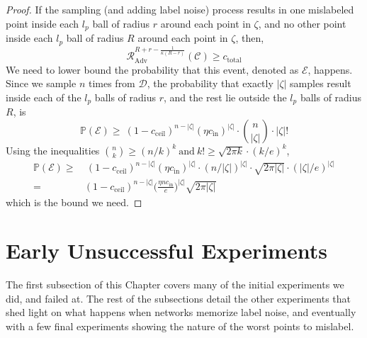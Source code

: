 \documentclass{ociamthesis}
\begin{document}
\begin{proof}
If the sampling (and adding label noise) process results in one mislabeled point
inside each $l_p$ ball of radius $r$ around each point in $\zeta$, and no other
point inside each $l_p$ ball of radius $R$ around each point in $\zeta$, then,
\begin{equation*}
    \mathcal{R}_{\text{Adv}}^{R+r-\frac{1}{\kappa(R-r)}}
    (\mathcal{C}) \geq
    c_{\text{total}}
\end{equation*}
We need to lower bound the probability that this event, denoted as
$\mathcal{E}$, happens. Since we sample $n$ times from $\mathcal{D}$, the
probability that exactly $|\zeta|$ samples result inside each of the $l_p$ balls
of radius $r$, and the rest lie outside the $l_p$ balls of radius $R$, is
\begin{equation*}
        \mathbb{P}(\mathcal{E})
        \geq 
        ~(1-c_{\text{ceil}})^{n-|\zeta|}
        (\eta c_\text{in})^{|\zeta|} \cdot {n \choose |\zeta|} \cdot |\zeta|!
\end{equation*}
Using the inequalities ${n \choose k} \geq (n/k)^k~\text{and}~k! \geq \sqrt{2\pi
k}\cdot(k/e)^k$,
\begin{equation*}
    \begin{split}
        \mathbb{P}(\mathcal{E})
        \geq &
        ~(1-c_{\text{ceil}})^{n-|\zeta|}
        (\eta c_\text{in})^{|\zeta|} \cdot {(n/|\zeta|)^{|\zeta|}} \cdot
        \sqrt{2\pi |\zeta|}\cdot(|\zeta|/e)^{|\zeta|} \\
        = &
        (1-c_{\text{ceil}})^{n-|\zeta|}
        \biggl (
            \frac{\eta n c_{\text{in}}}{e}
        \biggr )^{|\zeta|}
        \sqrt{2 \pi |\zeta|}
    \end{split}
\end{equation*}
which is the bound we need.
\end{proof}





\chapter{Early Unsuccessful Experiments}
\label{chapter:failed-exp}

The first subsection of this Chapter covers many of the initial experiments we
did, and failed at. The rest of the subsections detail the other experiments
that shed light on what happens when networks memorize label noise, and
eventually with a few final experiments showing the nature of the worst points
to mislabel.
\end{document}
